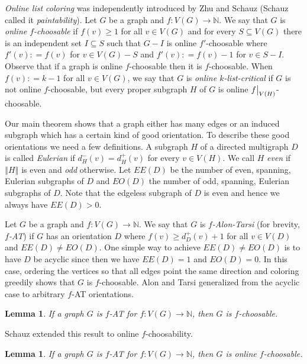 \documentclass[12pt]{article}
\theoremstyle{plain}
\newtheorem{lem}[thm]{Lemma}
\theoremstyle{definition}
\theoremstyle{remark}
\newcommand{\IN}{\mathbb{N}}
\newcommand{\size}[1]{\left\Vert#1\right\Vert}
\newcommand{\func}[3]{#1\colon #2 \rightarrow #3}
\newcommand{\DefinedAs}{\mathrel{\mathop:}=}
\newcommand\restr[2]{{%
  \left.\kern-\nulldelimiterspace %
  #1 %
  \vphantom{\big|} %
  \right|_{#2} %
  }}
\begin{document}
\emph{Online list coloring} was independently introduced by Zhu \cite{zhu2009online} and Schauz \cite{schauz2009mr} (Schauz called it \emph{paintability}). Let $G$ be a graph and $\func{f}{V(G)}{\IN}$.  We say that $G$ is \emph{online $f$-choosable} if $f(v) \ge 1$ for all $v \in V(G)$ and for every $S \subseteq V(G)$ there is an independent set $I \subseteq S$ such that $G-I$ is online $f'$-choosable where $f'(v) \DefinedAs f(v)$ for $v \in V(G) - S$ and $f'(v) \DefinedAs f(v) - 1$ for $v \in S - I$.
Observe that if a graph is online $f$-choosable then it is $f$-choosable. 
When $f(v) \DefinedAs k-1$ for all $v \in V(G)$, we say that $G$ is \emph{online $k$-list-critical} if $G$ is not online $f$-choosable, 
but every proper subgraph $H$ of $G$ is online $\restr{f}{V(H)}$-choosable. 

Our main theorem shows that a graph either has many edges or an induced subgraph which has a certain kind of good orientation.  To describe these good orientations we need a few definitions. A subgraph $H$ of a directed multigraph $D$ is called \emph{Eulerian} if $d^-_H(v) = d^+_H(v)$ for every $v \in V(H)$.  We call $H$ \emph{even} if $\size{H}$ is even and \emph{odd} otherwise.  Let $EE(D)$ be the number of even, spanning, Eulerian subgraphs of $D$ and $EO(D)$ the number of odd, spanning, Eulerian subgraphs of $D$.  Note that the edgeless subgraph of $D$ is even and hence we always have $EE(D) > 0$.

Let $G$ be a graph and $\func{f}{V(G)}{\IN}$.  We say that $G$ is \emph{$f$-Alon-Tarsi} (for brevity, \emph{$f$-AT}) if $G$ has an orientation $D$ where $f(v) \ge d_{D}^+(v) + 1$ for all $v \in V(D)$ and $EE(D) \ne EO(D)$. One simple way to achieve $EE(D) \ne EO(D)$ is to have $D$ be acyclic since then we have $EE(D) = 1$ and $EO(D) = 0$.  In this case, ordering the vertices so that all edges point the same direction and coloring greedily shows that $G$ is $f$-choosable. Alon and Tarsi \cite{Alon1992125} generalized from the acyclic case to arbitrary $f$-AT orientations.

\begin{lem}\label{AlonTarsi}
	If a graph $G$ is $f$-AT for $\func{f}{V(G)}{\IN}$, then $G$ is $f$-choosable.
\end{lem}

\noindent Schauz \cite{schauz2010flexible} extended this result to online $f$-choosability.

\begin{lem}\label{Schauz}
	If a graph $G$ is $f$-AT for $\func{f}{V(G)}{\IN}$, then $G$ is online $f$-choosable.
\end{lem}
\end{document}
